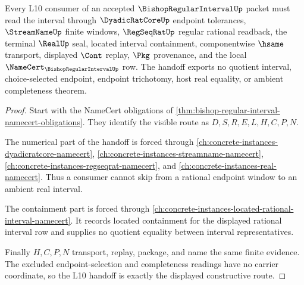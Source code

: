 \begin{theorem}
\label{thm:bishop-regular-interval-l10-handoff}
Every L10 consumer of an accepted $\BishopRegularIntervalUp$ packet must read the interval through $\DyadicRatCoreUp$ endpoint tolerances, $\StreamNameUp$ finite windows, $\RegSeqRatUp$ regular rational readback, the terminal $\RealUp$ seal, located interval containment, componentwise $\hsame$ transport, displayed $\Cont$ replay, $\Pkg$ provenance, and the local $\NameCert_{\BishopRegularIntervalUp}$ row. The handoff exports no quotient interval, choice-selected endpoint, endpoint trichotomy, host real equality, or ambient completeness theorem.
\end{theorem}
\begin{proof}
Start with the NameCert obligations of \autoref{thm:bishop-regular-interval-namecert-obligations}. They identify the visible route as $D,S,R,E,L,H,C,P,N$.

The numerical part of the handoff is forced through \autoref{ch:concrete-instances-dyadicratcore-namecert}, \autoref{ch:concrete-instances-streamname-namecert}, \autoref{ch:concrete-instances-regseqrat-namecert}, and \autoref{ch:concrete-instances-real-namecert}. Thus a consumer cannot skip from a rational endpoint window to an ambient real interval.

The containment part is forced through \autoref{ch:concrete-instances-located-rational-interval-namecert}. It records located containment for the displayed rational interval row and supplies no quotient equality between interval representatives.

Finally $H,C,P,N$ transport, replay, package, and name the same finite evidence. The excluded endpoint-selection and completeness readings have no carrier coordinate, so the L10 handoff is exactly the displayed constructive route.
\end{proof}



